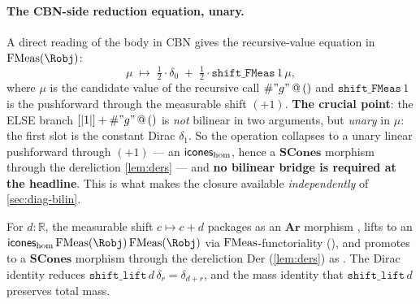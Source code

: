 \paragraph{The CBN-side reduction equation, unary.}
A direct reading of the body in CBN gives the recursive-value equation
in $\FMeas(\Robj)$:
\[
  \mu \;\mapsto\;
  \tfrac{1}{2}\cdot \delta_0 \;+\; \tfrac{1}{2}\cdot
  \texttt{shift\_FMeas}\,1\,\mu,
\]
where $\mu$ is the candidate value of the recursive call
$\#"g"\,@\,()$ and $\texttt{shift\_FMeas}\,1$ is the pushforward
through the measurable shift $(+1)$. \textbf{The crucial point}: the
ELSE branch $[|1|] + \#"g"\,@\,()$ is \emph{not} bilinear in two
arguments, but \emph{unary} in $\mu$: the first slot is the constant
Dirac $\delta_1$. So the operation collapses to a unary linear
pushforward through $(+1)$ --- an $\mathsf{icones}_{\mathrm{hom}}$, hence a
$\mathbf{SCones}$ morphism through the dereliction
\autoref{lem:ders} --- and \textbf{no bilinear bridge is required at
the headline}. This is what makes the closure available
\emph{independently} of \autoref{sec:diag-bilin}.

\begin{definition}\label{def:cbn-shift}
\rocqok
{}\rocqok
{}\rocqok
{}
For $d : \mathbb{R}$, the measurable shift $c \mapsto c + d$ packages
as an $\mathbf{Ar}$ morphism
,
lifts to an $\icones_{\mathrm{hom}}\,\FMeas(\Robj)\,\FMeas(\Robj)$ via
$\mathrm{FMeas}$-functoriality
(), and promotes to a
$\mathbf{SCones}$ morphism through the dereliction
$\mathrm{Der}$ (\autoref{lem:ders})
as . The Dirac identity
 reduces
$\texttt{shift\_lift}\,d\,\delta_r = \delta_{d+r}$, and the mass identity
 that
$\texttt{shift\_lift}\,d$ preserves total mass.
\end{definition}

